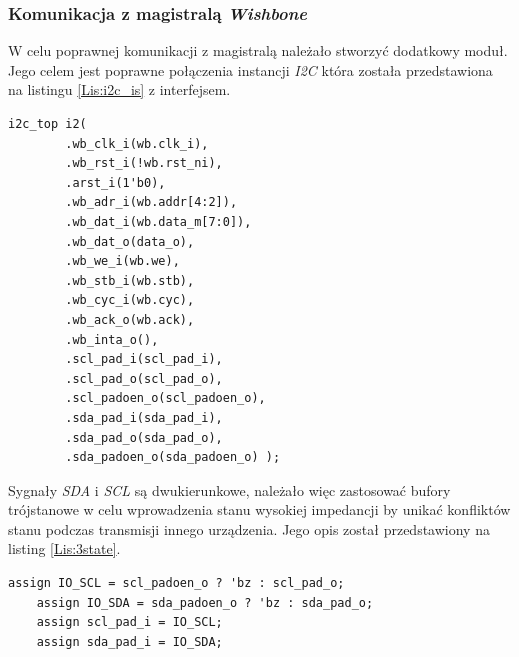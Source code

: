 \documentclass[11pt,a4paper]{article}
\begin{document}
		\subsubsection{Komunikacja z magistralą \textit{Wishbone}}
		W celu poprawnej komunikacji z magistralą należało stworzyć dodatkowy moduł. Jego celem jest poprawne połączenia instancji \textit{I2C} która została przedstawiona na listingu \ref{Lis:i2c_is} z interfejsem.\\
 			 \begin{minipage}{\textwidth}
\begin{scriptsize}
\begin{lstlisting}[label=Lis:i2c_is,caption=Bufor trójstanowy]
	i2c_top i2(
		.wb_clk_i(wb.clk_i),
		.wb_rst_i(!wb.rst_ni),
		.arst_i(1'b0),
		.wb_adr_i(wb.addr[4:2]),
		.wb_dat_i(wb.data_m[7:0]),
		.wb_dat_o(data_o),
		.wb_we_i(wb.we),
		.wb_stb_i(wb.stb),
		.wb_cyc_i(wb.cyc),
		.wb_ack_o(wb.ack),
		.wb_inta_o(),
		.scl_pad_i(scl_pad_i),
		.scl_pad_o(scl_pad_o),
		.scl_padoen_o(scl_padoen_o),
		.sda_pad_i(sda_pad_i),
		.sda_pad_o(sda_pad_o),
		.sda_padoen_o(sda_padoen_o)	);
\end{lstlisting}
\end{scriptsize}
\end{minipage}		
Sygnały \textit{SDA} i \textit{SCL} są dwukierunkowe, należało więc zastosować bufory trójstanowe w celu  wprowadzenia stanu wysokiej impedancji by unikać konfliktów stanu podczas transmisji innego urządzenia.  Jego opis został przedstawiony na listing \ref{Lis:3state}.\\
 \begin{minipage}{\textwidth}
\begin{scriptsize}
\begin{lstlisting}[label=Lis:3state,caption=Bufor trójstanowy]
	assign IO_SCL = scl_padoen_o ? 'bz : scl_pad_o;
	assign IO_SDA = sda_padoen_o ? 'bz : sda_pad_o;
	assign scl_pad_i = IO_SCL;
	assign sda_pad_i = IO_SDA;
\end{lstlisting}
\end{scriptsize}
\end{minipage}
\end{document}
